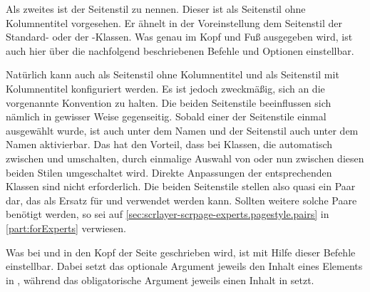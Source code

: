 Als zweites ist der Seitenstil
 zu
nennen. Dieser ist als Seitenstil ohne Kolumnentitel vorgesehen. Er ähnelt in
der Voreinstellung dem Seitenstil
 der Standard- oder der
\KOMAScript-Klassen. Was genau im Kopf und Fuß ausgegeben wird, ist auch hier
über die nachfolgend beschriebenen Befehle und Optionen einstellbar.

Natürlich kann auch  als Seitenstil ohne Kolumnentitel
und  als Seitenstil mit Kolumnentitel
konfiguriert werden. Es ist jedoch zweckmäßig, sich an die vorgenannte
Konvention zu halten. Die beiden Seitenstile beeinflussen sich nämlich in
gewisser Weise gegenseitig. Sobald einer der Seitenstile einmal ausgewählt
wurde, ist  auch unter dem Namen
%
 und der Seitenstil
 auch unter dem Namen
%
 aktivierbar. Das hat den Vorteil, dass bei
Klassen, die automatisch zwischen  und 
umschalten, durch einmalige Auswahl von  oder
 nun zwischen diesen beiden Stilen umgeschaltet
wird. Direkte Anpassungen der entsprechenden Klassen sind nicht
erforderlich. Die beiden Seitenstile stellen also quasi ein Paar dar, das als
Ersatz für  und  verwendet werden
kann. Sollten weitere solche Paare benötigt werden, so sei auf
\autoref{sec:scrlayer-scrpage-experts.pagestyle.pairs} in
\autoref{part:forExperts} verwiesen.%
\EndIndexGroup


\begin{Declaration}
\end{Declaration}
\iffalse%
Was in den Kopf der Seitenstile
\DescRef{\LabelBase.pagestyle.plain.scrheadings} und
\DescRef{\LabelBase.pagestyle.scrheadings} %
\else%
Was bei  und
 in den Kopf der Seite %
\fi%
geschrieben wird, ist mit Hilfe dieser Befehle einstellbar. Dabei setzt das
optionale Argument jeweils den Inhalt eines Elements in
%
\iffalse%
\iffree{}{ beziehungsweise \PageStyle{scrplain}} \fi , während das
obligatorische Argument jeweils einen Inhalt in
 setzt.

